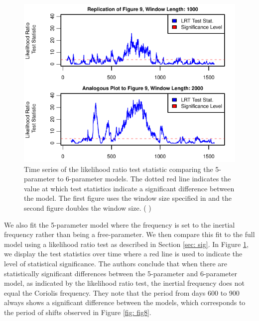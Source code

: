 \documentclass{stat572Style}
\newcommand{\vmcomment}[1]{({\color{blue}{VM's comment:}} \textbf{\color{blue}{#1}})}
\begin{document}
 \begin{figure}[h!]
  \centering
    \includegraphics[width=.85\textwidth]{ReplicatedFigures/fig9Extend.pdf}
        \caption{Time series of the likelihood ratio test statistic comparing the 5-parameter to 6-parameter models. The dotted red line indicates the value at which test statistics indicate a significant difference between the model. The first figure uses the window size specified in \citet{Sykulski2016} and the second figure doubles the window size. \vmcomment{Add x-axis label to the bottom plot.}}
        	\label{fig: fig9}
\end{figure}

   
   

\par We also fit the 5-parameter model where the frequency is set to the inertial frequency rather than being a free-parameter. 
We then compare this fit to the full model using a likelihood ratio test as described in Section \ref{sec: sig}.
 In Figure \ref{fig: fig9}, we display the test statistics over time where a red line is used to indicate the level of statistical significance. 
The authors conclude that when there are statistically significant differences between the 5-parameter and 6-parameter model, as indicated by the likelihood ratio test,   the inertial frequency does not equal the Coriolis frequency.   
They note that the period from days 600 to 900 always shows a significant difference between the models, which corresponds to the period of shifts observed in Figure \ref{fig: fig8}.
\end{document}
